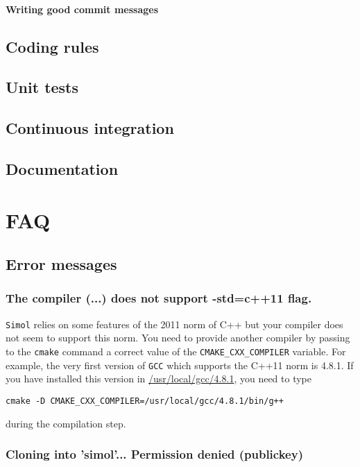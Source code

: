 \documentclass[12pt]{book}
\newcommand{\Simol}{\texttt{Simol}\xspace}
\begin{document}
\subsubsection{Writing good commit messages}



\section{Coding rules}
\section{Unit tests}
\section{Continuous integration}
\section{Documentation}


\chapter{FAQ}

\section{Error messages}


\subsection{The compiler (...) does not support -std=c++11 flag.}

\Simol relies on some features of the 2011 norm of C++ but your compiler does not seem to support this norm. You need to provide another compiler by passing to the \texttt{cmake} command a correct value of the \texttt{CMAKE\_CXX\_COMPILER} variable. For example, the very first version of \texttt{GCC} which supports the C++11 norm is 4.8.1. If you have installed this version in \url{/usr/local/gcc/4.8.1}, you need to type
\lstset{language=bash} 
\begin{lstlisting}
cmake -D CMAKE_CXX_COMPILER=/usr/local/gcc/4.8.1/bin/g++
\end{lstlisting}
during the compilation step.

\subsection{Cloning into 'simol'... Permission denied (publickey)}
\end{document}
